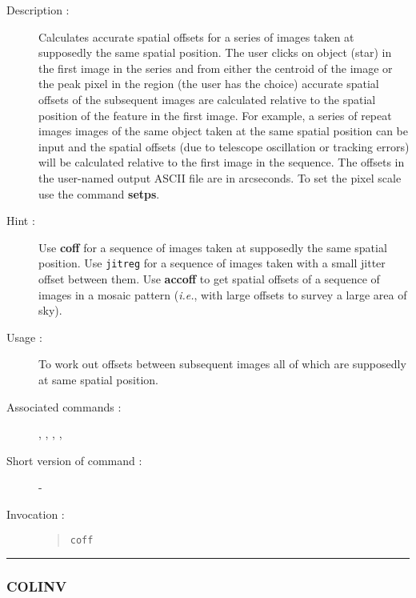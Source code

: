 \begin{description}

\item[Description :] Calculates accurate spatial offsets for a series
of images taken at supposedly the same spatial position. The user
clicks on object (star) in the first image in the series and from
either the centroid of the image or the peak pixel in the region (the
user has the choice) accurate spatial offsets of the subsequent images
are calculated relative to the spatial position of the feature in the
first image.  For example, a series of repeat images images of the same
object taken at the same spatial position can be input and the spatial
offsets (due to telescope oscillation or tracking errors) will be
calculated relative to the first image in the sequence.  The offsets in
the user-named output ASCII file are in arcseconds.  To set the pixel
scale use the command {\bf setps}.

\item[Hint :] Use {\bf coff} for a sequence of images taken at supposedly the
same spatial position. Use {\tt jitreg} for a sequence of images taken with a
small jitter offset between them. Use {\bf accoff} to get spatial
offsets of a sequence of images in a mosaic pattern (\emph{i.e.}, with
large offsets to survey a large area of sky).

\item[Usage :] To work out offsets between subsequent images all of
which are supposedly at same spatial position.
\item[Associated commands :] {\tt {}},
{\tt {}}, {\tt {}},
{\tt {}}, {\tt {}}
\item[Short version of command :] -
\item[Invocation :]

\begin{quote}{\tt  coff }\end{quote}

\end{description}

\hrule
\subsubsection*{\label{COLINV}COLINV}

